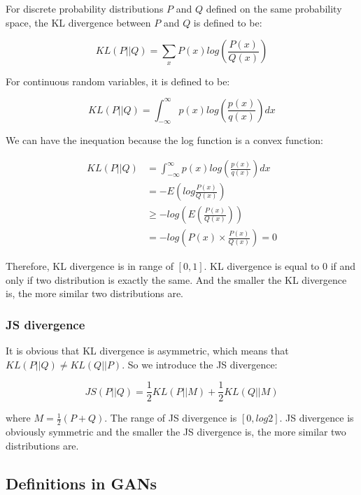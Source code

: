 \documentclass{article} %
\begin{document}
For discrete probability distributions $P$ and $Q$ defined on the same probability space, the KL divergence between $P$ and $Q$ is defined to be:

\begin{equation}
    KL(P||Q) = \sum_{x}P(x)log(\frac{P(x)}{Q(x)})
\end{equation}

For continuous random variables, it is defined to be:

\begin{equation}
    KL(P||Q) = \int_{-\infty}^{\infty}p(x)log(\frac{p(x)}{q(x)})dx
\end{equation}

We can have the inequation because the log function is a convex function: 

\begin{equation}
    \begin{split}
        KL(P||Q) & = \int_{-\infty}^{\infty}p(x)log(\frac{p(x)}{q(x)})dx \\
                 & = -E(log\frac{P(x)}{Q(x)}) \\
                 & \geq -log(E(\frac{P(x)}{Q(x)})) \\
                 & = -log(P(x) \times \frac{P(x)}{Q(x)}) = 0
    \end{split}
\end{equation}

Therefore, KL divergence is in range of $[0, 1]$. KL divergence is equal to $0$ if and only if two distribution is exactly the same. And the smaller the KL divergence is, the more similar two distributions are.

\subsubsection{JS divergence}

It is obvious that KL divergence is asymmetric, which means that $KL(P||Q) \neq KL(Q||P)$. So we introduce the JS divergence:

\begin{equation}
    JS(P||Q) = \frac{1}{2}KL(P||M) + \frac{1}{2}KL(Q||M)
\end{equation}

where $M = \frac{1}{2}(P + Q)$. The range of JS divergence is $[0, log2]$. JS divergence is obviously symmetric and the smaller the JS divergence is, the more similar two distributions are.

\subsection{Definitions in GANs}
\end{document}
